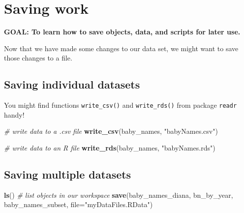 \documentclass[]{book}
\newenvironment{Shaded}{\begin{snugshade}}{\end{snugshade}}
\newcommand{\CommentTok}[1]{\textcolor[rgb]{0.56,0.35,0.01}{\textit{#1}}}
\newcommand{\DataTypeTok}[1]{\textcolor[rgb]{0.13,0.29,0.53}{#1}}
\newcommand{\KeywordTok}[1]{\textcolor[rgb]{0.13,0.29,0.53}{\textbf{#1}}}
\newcommand{\NormalTok}[1]{#1}
\newcommand{\StringTok}[1]{\textcolor[rgb]{0.31,0.60,0.02}{#1}}
\begin{document}
\hypertarget{saving-work}{%
\section{Saving work}\label{saving-work}}

\textbf{GOAL: To learn how to save objects, data, and scripts for later use.}

Now that we have made some changes to our data set, we might want to
save those changes to a file.

\hypertarget{saving-individual-datasets}{%
\subsection{Saving individual datasets}\label{saving-individual-datasets}}

You might find functions \texttt{write\_csv()} and \texttt{write\_rds()} from package
\texttt{readr} handy!

\begin{Shaded}
\begin{Highlighting}[]
\CommentTok{# write data to a .csv file}
\KeywordTok{write_csv}\NormalTok{(baby_names, }\StringTok{"babyNames.csv"}\NormalTok{)}
\end{Highlighting}
\end{Shaded}

\begin{Shaded}
\begin{Highlighting}[]
\CommentTok{# write data to an R file}
\KeywordTok{write_rds}\NormalTok{(baby_names, }\StringTok{"babyNames.rds"}\NormalTok{)}
\end{Highlighting}
\end{Shaded}

\hypertarget{saving-multiple-datasets}{%
\subsection{Saving multiple datasets}\label{saving-multiple-datasets}}

\begin{Shaded}
\begin{Highlighting}[]
\KeywordTok{ls}\NormalTok{() }\CommentTok{# list objects in our workspace}
\KeywordTok{save}\NormalTok{(baby_names_diana, bn_by_year, baby_names_subset, }\DataTypeTok{file=}\StringTok{"myDataFiles.RData"}\NormalTok{)  }
\end{Highlighting}
\end{Shaded}
\end{document}
